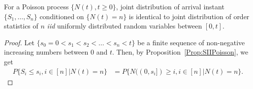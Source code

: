 \documentclass[a4paper,10pt,english]{article}
\begin{document}
\begin{prop}%
For a Poisson process $\{N(t), t\geqslant 0\}$, joint distribution of arrival instant $\{S_1, \ldots, S_n\}$ conditioned on $\{N(t)=n\}$ is identical to joint distribution of order statistics of $n$ \emph{iid} uniformly distributed random variables between $[0,t]$.
\end{prop}
\begin{proof} Let $\{ s_0 = 0 < s_1 < s_2 <\ldots < s_n < t \}$ be a finite sequence of non-negative increasing numbers between $0$ and $t$. Then, by Proposition~\ref{Prop:SIIPoisson}, we get
\begin{align*}
P\{S_i \leq s_i, i \in [n] | N(t) = n\} &= P\{N((0, s_i]) \geq i, i \in [n] | N(t) = n\}.
\end{align*}
\end{proof}
\end{document}
